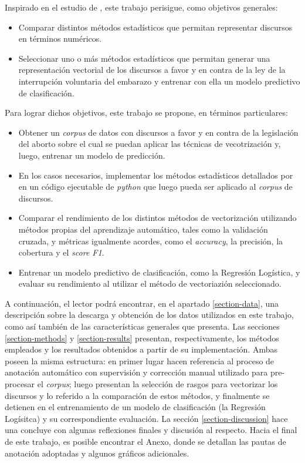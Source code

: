 Inspirado en el estudio de \cite{monroe2008fightin}, este trabajo
perisigue, como objetivos generales:

\begin{itemize}
    \item{Comparar distintos m\'etodos estad\'isticos que permitan representar
    discursos en t\'erminos num\'ericos.}
    \item{Seleccionar uno o más m\'etodos estad\'isticos que permitan
    generar una representación vectorial de los discursos a favor y en
    contra de la ley de la interrupción voluntaria del embarazo y entrenar
    con ella un modelo predictivo de clasificación.}
\end{itemize}

Para lograr dichos objetivos, este trabajo se propone, en términos
particulares:

\begin{itemize}
    \item{Obtener un \textit{corpus} de datos con discursos a favor y en contra
    de la legislación del aborto sobre el cual se puedan aplicar las técnicas de
    vecotrización y, luego, entrenar un modelo de predicción.}
    \item{En los casos necesarios, implementar los métodos estadísticos detallados
    por \cite{monroe2008fightin} en un código ejecutable de \textit{python} que
    luego pueda ser aplicado al \textit{corpus} de discursos.}
    \item{Comparar el rendimiento de los distintos métodos de vectorización utilizando
    métodos propias del aprendizaje automático, tales como la validación
    cruzada, y métricas igualmente acordes, como el \textit{accuracy}, la precisión,
    la cobertura y el \textit{score F1}.}
    \item{Entrenar un modelo predictivo de clasificación, como la Regresión Logística,
    y evaluar su rendimiento al utilizar el método de vectoriazión seleccionado.}
\end{itemize}

A continuación, el lector podrá encontrar, en el apartado \ref{section-data},
una descripción sobre la descarga y obtención de los datos utilizados en este
trabajo, como así también de las características generales que presenta. Las
secciones \ref{section-methods} y \ref{section-results} presentan, respectivamente,
los métodos empleados y los resultados obtenidos a partir de su implementación.
Ambas poseen la misma estructura: en primer lugar hacen referencia
al proceso de anotación automático con supervisión y corrección manual utilizado
para pre-procesar el \textit{corpus}; luego presentan la selección de rasgos
para vectorizar los discursos y lo referido a la comparación de estos métodos, y
finalmente se detienen en el entrenamiento de un modelo de clasificación (la
Regresión Logísitca) y su correspondiente evaluación. La sección
\ref{section-discussion} hace una concluye con algunas reflexiones finales y
discusión al respecto. Hacia el final de este trabajo, es posible encontrar el
Anexo, donde se detallan las pautas de anotación adoptadas y algunos gráficos
adicionales.
